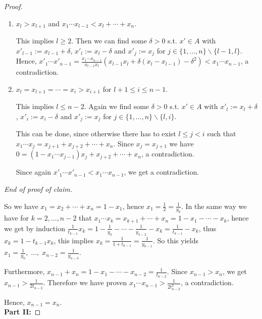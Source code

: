 \documentclass[a4paper,twoside]{article}
\begin{document}
\begin{proof}
\begin{enumerate}
In this case we can proceed.

\item $x_l > x_{l+1}$ and $x_1 \cdots x_{l-1} < x_l + \cdots + x_n$.

This implies $l \geq 2$. Then we can find some $\delta > 0$ s.t. 
$x' \in A$ with $x'_{l-1} := x_{l-1} + \delta$, $x'_l := x_l - \delta$ and 
$x'_j := x_j$ for $j \in \{1, \ldots, n\}\backslash\{l-1,l\}$. Hence, 
$x'_1 \cdots x'_{n-1} = \frac{x_1 \cdots x_{n-1}}{x_{l-1} x_l} (x_{l-1} x_l + \delta (x_l - x_{l-1}) - \delta^2) 
< x_1 \cdots x_{n-1}$, a contradiction.

\item $x_l = x_{l+1} = \cdots = x_i > x_{i+1}$ for $l+1 \leq i \leq n-1$. 

This implies $l \leq n-2$. Again we find some $\delta > 0$ s.t. 
$x' \in A$ with $x'_l := x_l + \delta$, $x'_i := x_i - \delta$ and 
$x'_j := x_j$ for $j \in \{1, \ldots, n\}\backslash\{l,i\}$. 

This can be done, since otherwise there has to exist 
$l \leq j < i$ such that $x_1 \cdots x_j = x_{j+1} + x_{j+2} + \cdots + x_n$. Since $x_j = x_{j+1}$ we have 
$0 = (1 - x_1 \cdots x_{j-1}) x_j + x_{j+2} + \cdots + x_n$, a contradiction.

Since again $x'_1 \cdots x'_{n-1} < x_1 \cdots x_{n-1}$, we get a contradiction.

\end{enumerate}

{\em End of proof of claim.}
\medskip

So we have $x_1 = x_2 + \cdots + x_n = 1 - x_1$, hence $x_1 = \frac{1}{2} = \frac{1}{y_0}$. In the same way we have for $k = 2, \ldots, n-2$ 
that $x_1 \cdots x_k = x_{k+1} + \cdots + x_n = 1 - x_1 - \cdots - x_k$, hence 
we get by induction $\frac{1}{t_{k-1}} x_k = 1 - \frac{1}{y_0} - \cdots - \frac{1}{y_{k-2}} - x_k = \frac{1}{t_{k-1}} - x_k$, 
thus $x_k =  1 - t_{k-1} x_k$, this implies $x_k = \frac{1}{1 + t_{k-1}} = \frac{1}{y_{k-1}}$. So this yields
$x_1 = \frac{1}{y_0},\; \ldots,\; x_{n-2} = \frac{1}{y_{n-3}}$. 

Furthermore, $x_{n-1} + x_n = 1 - x_1 - \cdots - x_{n-2} = \frac{1}{t_{n-2}}$. Since $x_{n-1} > x_n$, we get 
$x_{n-1} > \frac{1}{2 t_{n-2}}$. Therefore we have proven 
$x_1 \cdots x_{n-1} > \frac{1}{2 t_{n-2}^2}$, a contradiction.

\medskip

Hence, $x_{n-1} = x_n$.\\

\textbf{Part II:}


\end{proof}
\end{document}
